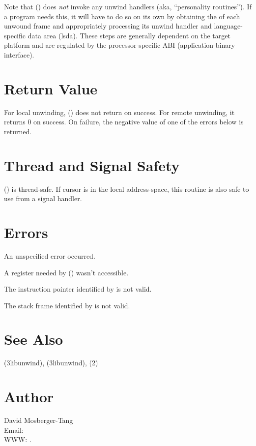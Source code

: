 \documentclass{article}
\begin{document}
Note that () does \emph{not} invoke any unwind
handlers (aka, ``personality routines'').  If a program needs this, it
will have to do so on its own by obtaining the 
of each unwound frame and appropriately processing its unwind handler
and language-specific data area (lsda).  These steps are generally
dependent on the target platform and are regulated by the
processor-specific ABI (application-binary interface).

\section{Return Value}

For local unwinding, () does not return on success.
For remote unwinding, it returns 0 on success.  On failure, the
negative value of one of the errors below is returned.

\section{Thread and Signal Safety}

() is thread-safe.  If cursor  is in the
local address-space, this routine is also safe to use from a signal
handler.

\section{Errors}

\begin{Description}
\item[\Const{UNW\_EUNSPEC}] An unspecified error occurred.
\item[\Const{UNW\_EBADREG}] A register needed by () wasn't
  accessible.
\item[\Const{UNW\_EINVALIDIP}] The instruction pointer identified by
   is not valid.
\item[\Const{UNW\_BADFRAME}] The stack frame identified by
   is not valid.
\end{Description}

\section{See Also}

(3libunwind),
(3libunwind),
(2)

\section{Author}

\noindent
David Mosberger-Tang\\
Email: \\
WWW: .
\LatexManEnd
\end{document}
